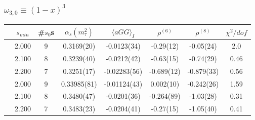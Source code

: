 \documentclass{beamer}
\begin{document}
\begin{frame}
  \frametitle{\(\omega_{3,0} \equiv (1-x)^3\)}
  \begin{adjustbox}{max width=\textwidth}
    \begin{tabular}{cccccccc}
      \toprule
      & \(s_{min}\) & \#\(s_0\)s & \(\alpha_s(m_\tau^2)\) & \(\langle aGG \rangle_I\) & \(\rho^{(6)}\) & \(\rho^{(8)}\) & \(\chi^2/dof\)  \\
      \midrule
      \parbox[t]{2mm}{}
      & 2.000 & 9 & 0.3169(20) & -0.0123(34) & -0.29(12) & -0.05(24) & 2.0 \\
      & 2.100 & 8 & 0.3239(40) & -0.0212(42) & -0.63(15) & -0.74(29) & 0.46 \\
      & 2.200 & 7 & 0.3251(17) & -0.02283(56) & -0.689(12) & -0.879(33) & 0.56 \\
      \midrule
      \parbox[t]{2mm}{}
      & 2.000 & 9  & 0.33985(81) & -0.01124(43) & 0.002(10) & -0.242(26) & 1.59 \\
      & 2.100 & 8  & 0.3480(47) & -0.0201(36) & -0.264(89) & -1.03(28) & 0.31 \\
      & 2.200 & 7  & 0.3483(23) & -0.0204(41) & -0.27(15) & -1.05(40) & 0.41 \\
      \bottomrule
    \end{tabular}
  \end{adjustbox}
\end{frame}
\end{document}
